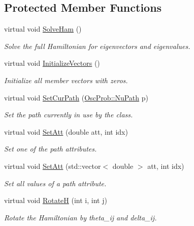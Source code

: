 \subsection*{Protected Member Functions}
\begin{DoxyCompactItemize}
\item 
virtual void \hyperlink{classOscProb_1_1PMNS__Sterile_af60f89862d0fe333c62d6f87ecfd89f8}{Solve\+Ham} ()
\begin{DoxyCompactList}\small\item\em Solve the full Hamiltonian for eigenvectors and eigenvalues. \end{DoxyCompactList}\item 
virtual void \hyperlink{classOscProb_1_1PMNS__Base_adf23b569112f9f9e0e592f01d79a5f3d}{Initialize\+Vectors} ()
\begin{DoxyCompactList}\small\item\em Initialize all member vectors with zeros. \end{DoxyCompactList}\item 
virtual void \hyperlink{classOscProb_1_1PMNS__Base_a986e6ebef09a7e2eb7fee16a4c2c834d}{Set\+Cur\+Path} (\hyperlink{structOscProb_1_1NuPath}{Osc\+Prob\+::\+Nu\+Path} p)
\begin{DoxyCompactList}\small\item\em Set the path currently in use by the class. \end{DoxyCompactList}\item 
virtual void \hyperlink{classOscProb_1_1PMNS__Base_aba565962a440d14bee7a2a96d2eca2c5}{Set\+Att} (double att, int idx)
\begin{DoxyCompactList}\small\item\em Set one of the path attributes. \end{DoxyCompactList}\item 
virtual void \hyperlink{classOscProb_1_1PMNS__Base_aa001479b5f5828c3d16ed087f96ecbcc}{Set\+Att} (std\+::vector$<$ double $>$ att, int idx)
\begin{DoxyCompactList}\small\item\em Set all values of a path attribute. \end{DoxyCompactList}\item 
virtual void \hyperlink{classOscProb_1_1PMNS__Base_aae18afd69074211335f49ec40e6011b9}{RotateH} (int i, int j)
\begin{DoxyCompactList}\small\item\em Rotate the Hamiltonian by theta\+\_\+ij and delta\+\_\+ij. \end{DoxyCompactList}\item 

\end{DoxyCompactItemize}
